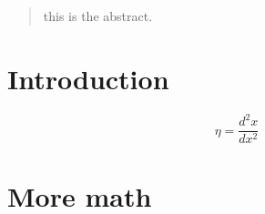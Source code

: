 \documentclass[a4paper,10pt]{article}
\title{}
\author{}
\begin{document}
\maketitle

\begin{abstract}
this is the abstract.
\end{abstract}

\section{Introduction}
$$\eta=\frac{d^{2}x}{dx^{2}}
$$
\section{More math}
\end{document}
